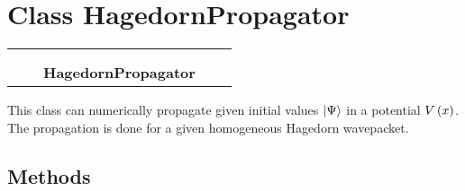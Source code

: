 
\section{Class HagedornPropagator}

    \label{HagedornPropagator:HagedornPropagator}
\begin{tabular}{cccccc}
\multicolumn{2}{r}{\settowidth{\BCL}{Propagator}\multirow{2}{\BCL}{Propagator}}
&&
  \\\cline{3-3}
  &&\multicolumn{1}{c|}{}
&&
  \\
&&\multicolumn{2}{l}{\textbf{HagedornPropagator}}
\end{tabular}

This class can numerically propagate given initial values
$\Ket{\Psi}$ in a potential
$V\left( x \right)$. The propagation is done for a given
homogeneous Hagedorn wavepacket.



  \subsection{Methods}

    \vspace{0.5ex}

